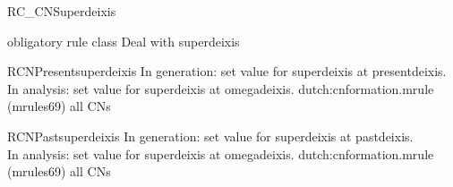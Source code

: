 \begin{mruleclass}{RC\_CNSuperdeixis}
\begin{classdescr}
\kind obligatory rule class
\classtask Deal with superdeixis
\classremarks

\nofilters

\nospeedrules

\noplannedrules

\norulesnotince


\end{classdescr}

\begin{members}
   
\begin{member}
 RCNPresentsuperdeixis
 In generation: set value for superdeixis at presentdeixis.\\
               In analysis: set value for superdeixis at omegadeixis.    
\file dutch:cnformation.mrule (mrules69)
\semantics \nosemantics
\example all CNs
\remarks\mbox{}

\end{member}
\begin{member}
 RCNPastsuperdeixis
 In generation: set value for superdeixis at pastdeixis.\\
               In analysis: set value for superdeixis at omegadeixis.    
\file dutch:cnformation.mrule (mrules69)
\semantics \nosemantics
\example all CNs 
\remarks\mbox{}

\end{member}
\end{members}
\end{mruleclass}
